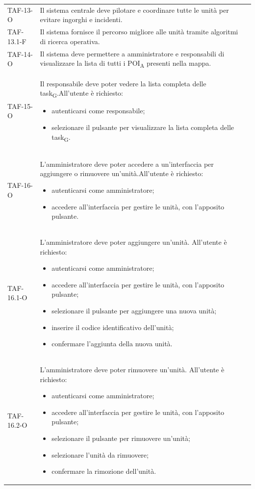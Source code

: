\begin{longtable}{ >{\centering}p{} >{}p{}
		>{\centering}p{}}
	TAF-13-O & Il sistema centrale deve pilotare e coordinare tutte le unità per evitare ingorghi e incidenti. & 0\tabularnewline

	TAF-13.1-F & Il sistema fornisce il percorso migliore alle unità tramite algoritmi di ricerca operativa. & 0\tabularnewline

	TAF-14-O & Il sistema deve permettere a amministratore e responsabili di visualizzare la lista di tutti i POI\textsubscript{A} presenti nella mappa. & 0\tabularnewline

	TAF-15-O & Il responsabile deve poter vedere la lista completa delle task\textsubscript{G}.\newline All'utente è richiesto:\begin{itemize} \item autenticarsi come responsabile; \item selezionare il pulsante per visualizzare la lista completa delle task\textsubscript{G}. \end{itemize} & 0\tabularnewline

	TAF-16-O & L'amministratore deve poter accedere a un'interfaccia per aggiungere o rimuovere un'unità.\newline All'utente è richiesto: \begin{itemize} \item autenticarsi come amministratore; \item accedere all'interfaccia per gestire le unità, con l'apposito pulsante.\end{itemize} & 0\tabularnewline

	TAF-16.1-O & L'amministratore deve poter aggiungere un'unità. \newline All'utente è richiesto: \begin{itemize} \item autenticarsi come amministratore; \item accedere all'interfaccia per gestire le unità, con l'apposito pulsante; \item selezionare il pulsante per aggiungere una nuova unità; \item inserire il codice identificativo dell'unità; \item confermare l'aggiunta della nuova unità.\end{itemize} & 0\tabularnewline

	TAF-16.2-O & L'amministratore deve poter rimuovere un'unità. \newline All'utente è richiesto: \begin{itemize} \item autenticarsi come amministratore; \item accedere all'interfaccia per gestire le unità, con l'apposito pulsante; \item selezionare il pulsante per rimuovere un'unità; \item selezionare l'unità da rimuovere; \item confermare la rimozione dell'unità.\end{itemize} & 0\tabularnewline



\end{longtable}
